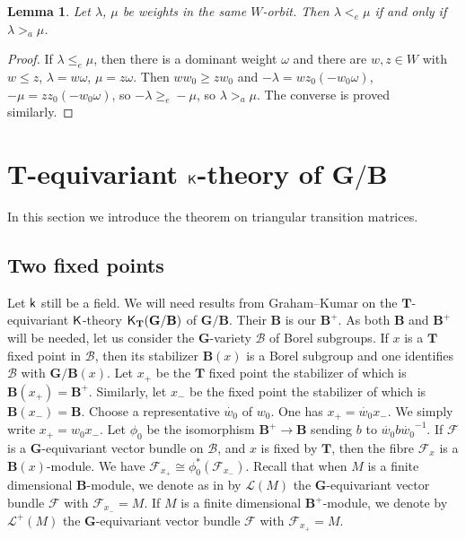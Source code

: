 \documentclass[sn-mathphys-num]{sn-jnl}%
\newcommand\F{{\mathcal F}}
\newcommand{\Ll}{\mathcal L}
\newcommand{\sk}{{\sf k}}
\newcommand{\sK}{{\sf K}}
\newcommand{\bg}{\mathbf G}
\newcommand{\fb}{\mathbf B}
\newcommand{\bt}{\mathbf T}
\newtheorem{lemma}[theorem]{Lemma}
\theoremstyle{definition}
\begin{document}
\begin{lemma}\label{lem:ea}
Let $\lambda$, $\mu$ be weights in the same $W$-orbit. Then $\lambda<_e\mu$ if and only if $\lambda>_a\mu$. 
\end{lemma}
\begin{proof}
If $\lambda\leq_e\mu$, then there is a dominant weight $\omega$ and there are $w, z\in W$ with $w\leq z$, $\lambda=w\omega$, $\mu=z\omega$. Then $ww_0\geq zw_0$ and $-\lambda=wz_0(-w_0\omega)$, $-\mu=zz_0(-w_0\omega)$, so $-\lambda\geq_e-\mu$, so $\lambda>_a\mu$. The converse is proved similarly.
\end{proof}

\section{$ \bt$-equivariant $\sK$-theory of $ \bg / \fb$}\label{sec:rappelT-equivGmodB}
In this section we introduce the theorem on triangular transition matrices.
\subsection{Two fixed points}
Let $\sk$ still be a field.
We will need results from Graham--Kumar \cite{GrahamKumar} on the $ \bt$-equivariant $\sK$-theory $\sK_{\bt}( \bg/\fb)$ of $ \bg/ \fb$.
Their $\fb$ is our $ \fb^+$. As both $\fb$ and $ \fb^+$ will be needed, let us consider the $\bg$-variety  
$\mathcal B$ of Borel subgroups.
If $x$ is a $ \bt$ fixed point in $\mathcal B$, then its stabilizer $ \fb(x)$ is a Borel subgroup and one identifies
$\mathcal B$ with $ \bg / \fb(x)$.
Let $x_+$ be the $ \bt$ fixed point the stabilizer of which is $ \fb(x_+)= \fb^+$. Similarly, let $x_-$ be the fixed point the stabilizer of which is $ \fb(x_-)= \fb$.
Choose a representative $\dot{w_0}$ of $w_0$.
One has $x_+= \dot{w_0}x_-$. We simply write $x_+= {w_0}x_-$.
Let $\phi_0$ be the isomorphism $ \fb^+\to\fb$ sending $b$ to 
$\dot{w_0}b\dot{w_0}^{-1}$. 
If $\F$ is a $ \bg $-equivariant vector bundle on $\mathcal B$, and $x$ is   fixed by $ \bt$, then the fibre $\F_x$ is a $ \fb(x)$-module.
We have $\F_{x_+}\cong \phi_0^*(\F_{x_-})$.
Recall that when $M$ is a finite dimensional $\fb$-module, we denote as in \cite{Jan} by $\Ll(M)$ the $ \bg $-equivariant vector bundle 
$\F$ with $\F_{x_-}=M$. If $M$ is a finite dimensional $ \fb^+$-module, we denote by $\Ll^+(M)$ the $ \bg $-equivariant vector bundle 
$\F$ with $\F_{x_+}=M$. 
\end{document}
